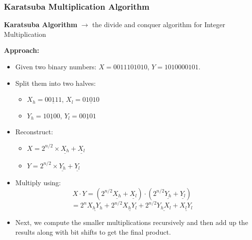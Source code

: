 \begin{frame}
    \frametitle{Karatsuba Multiplication Algorithm}
    \vspace{0.3cm} 
    \textbf{Karatsuba Algorithm} $\rightarrow$ the divide and conquer algorithm for Integer Multiplication
    
    \vspace{0.3cm}
    \textbf{Approach:}
    \begin{itemize}
        \item Given two binary numbers: \( X = 0011101010 \), \( Y = 1010000101 \).
        \item Split them into two halves:
        \begin{itemize}
            \item $X_h = \underline{00111}$, $X_l = \underline{01010}$
            \item $Y_h = \underline{10100}$, $Y_l = \underline{00101}$
        \end{itemize}
        \item Reconstruct:
        \begin{itemize}
            \item $X = 2^{n/2} \times \underline{X_h} + \underline{X_l}$
            \item $Y = 2^{n/2} \times \underline{Y_h} + \underline{Y_l}$
        \end{itemize}
        \item Multiply using:
        \begin{equation*}
            X \cdot Y = ( 2^{n/2} \underline{X_h} + \underline{X_l} ) \cdot ( 2^{n/2} \underline{Y_h} + \underline{Y_l} )
        \end{equation*}
        \begin{equation*}
            = 2^n \underline{X_h Y_h} + 2^{n/2} \underline{X_h Y_l} + 2^{n/2} \underline{Y_h X_l} + \underline{X_l Y_l}
        \end{equation*}
        \item Next, we compute the smaller multiplications recursively and then add up the results along with bit shifts to get the final product.
    \end{itemize}
\end{frame}

